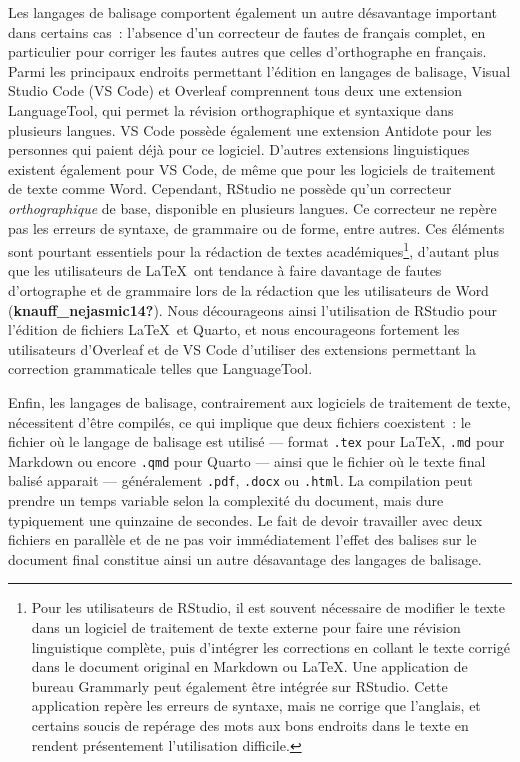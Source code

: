 \documentclass[
  letterpaper,
]{scrbook}
\begin{document}
Les langages de balisage comportent également un autre désavantage
important dans certains cas~: l'absence d'un correcteur de fautes de
français complet, en particulier pour corriger les fautes autres que
celles d'orthographe en français. Parmi les principaux endroits
permettant l'édition en langages de balisage, Visual Studio Code (VS
Code) et Overleaf comprennent tous deux une extension LanguageTool, qui
permet la révision orthographique et syntaxique dans plusieurs langues.
VS Code possède également une extension Antidote pour les personnes qui
paient déjà pour ce logiciel. D'autres extensions linguistiques existent
également pour VS Code, de même que pour les logiciels de traitement de
texte comme Word. Cependant, RStudio ne possède qu'un correcteur
\emph{orthographique} de base, disponible en plusieurs langues. Ce
correcteur ne repère pas les erreurs de syntaxe, de grammaire ou de
forme, entre autres. Ces éléments sont pourtant essentiels pour la
rédaction de textes académiques\footnote{Pour les utilisateurs de
  RStudio, il est souvent nécessaire de modifier le texte dans un
  logiciel de traitement de texte externe pour faire une révision
  linguistique complète, puis d'intégrer les corrections en collant le
  texte corrigé dans le document original en Markdown ou \LaTeX. Une
  application de bureau Grammarly peut également être intégrée sur
  RStudio. Cette application repère les erreurs de syntaxe, mais ne
  corrige que l'anglais, et certains soucis de repérage des mots aux
  bons endroits dans le texte en rendent présentement l'utilisation
  difficile.}, d'autant plus que les utilisateurs de \LaTeX~ont tendance
à faire davantage de fautes d'ortographe et de grammaire lors de la
rédaction que les utilisateurs de Word (\textbf{knauff\_nejasmic14?}).
Nous décourageons ainsi l'utilisation de RStudio pour l'édition de
fichiers \LaTeX~et Quarto, et nous encourageons fortement les
utilisateurs d'Overleaf et de VS Code d'utiliser des extensions
permettant la correction grammaticale telles que LanguageTool.

Enfin, les langages de balisage, contrairement aux logiciels de
traitement de texte, nécessitent d'être compilés, ce qui implique que
deux fichiers coexistent~: le fichier où le langage de balisage est
utilisé --- format \texttt{.tex} pour \LaTeX, \texttt{.md} pour Markdown
ou encore \texttt{.qmd} pour Quarto --- ainsi que le fichier où le texte
final balisé apparait --- généralement \texttt{.pdf}, \texttt{.docx} ou
\texttt{.html}. La compilation peut prendre un temps variable selon la
complexité du document, mais dure typiquement une quinzaine de secondes.
Le fait de devoir travailler avec deux fichiers en parallèle et de ne
pas voir immédiatement l'effet des balises sur le document final
constitue ainsi un autre désavantage des langages de balisage.
\end{document}
